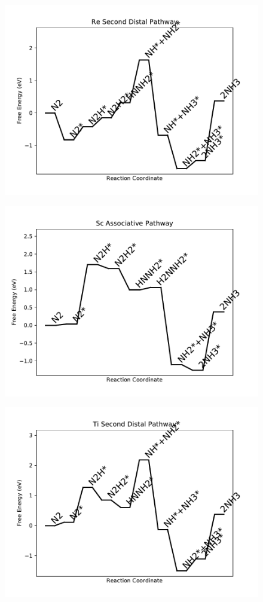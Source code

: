 \begin{figure}
\centering
\includegraphics[width=0.8\linewidth]{data/plots/Re_distal_2.pdf}
\end{figure}

\begin{figure}
\centering
\includegraphics[width=0.8\linewidth]{data/plots/Sc_associative.pdf}
\end{figure}

\begin{figure}
\centering
\includegraphics[width=0.8\linewidth]{data/plots/Ti_distal_2.pdf}
\end{figure}

